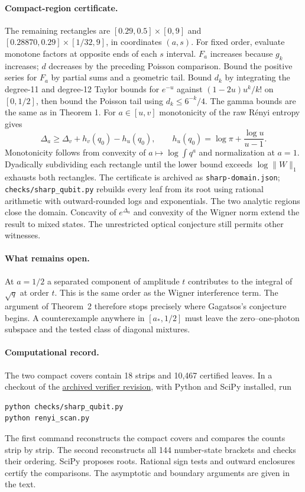 \documentclass[11pt]{article}
\newcommand{\D}{\Delta}
\begin{document}
\paragraph{Compact-region certificate.}
The remaining rectangles are $[0.29,0.5]\times[0,9]$ and $[0.28870,0.29]\times[1/32,9]$, in coordinates $(a,s)$. For fixed order, evaluate monotone factors at opposite ends of each $s$ interval. $F_a$ increases because $g_k$ increases; $d$ decreases by the preceding Poisson comparison. Bound the positive series for $F_a$ by partial sums and a geometric tail. Bound $d_k$ by integrating the degree-11 and degree-12 Taylor bounds for $e^{-u}$ against $(1-2u)u^k/k!$ on $[0,1/2]$, then bound the Poisson tail using $d_k\le6^{-k}/4$. The gamma bounds are the same as in Theorem 1. For $a\in[u,v]$ monotonicity of the raw R\'enyi entropy gives
\[
 \D_a\ge\D_v+h_v(q_0)-h_u(q_0),\qquad h_u(q_0)=\log\pi+\frac{\log u}{u-1}.
\]
Monotonicity follows from convexity of $a\mapsto\log\int q^a$ and normalization at $a=1$. Dyadically subdividing each rectangle until the lower bound exceeds $\log\|W\|_1$ exhausts both rectangles. The certificate is archived as \texttt{sharp-domain.json}; \texttt{checks/sharp\_qubit.py} rebuilds every leaf from its root using rational arithmetic with outward-rounded logs and exponentials. The two analytic regions close the domain. Concavity of $e^{\D_a}$ and convexity of the Wigner norm extend the result to mixed states. The unrestricted optical conjecture still permits other witnesses.

\paragraph{What remains open.}
At $a=1/2$ a separated component of amplitude $t$ contributes to the integral of $\sqrt q$ at order $t$. This is the same order as the Wigner interference term. The argument of Theorem~2 therefore stops precisely where Gagatsos's conjecture begins. A counterexample anywhere in $[a_*,1/2]$ must leave the zero--one-photon subspace and the tested class of diagonal mixtures.

\paragraph{Computational record.}
The two compact covers contain 18 strips and 10,467 certified leaves. In a checkout of the \href{https://github.com/shunyaekam/oo-research/tree/f043c097d8de06399ba3b95c753af113e436df9a}{archived verifier revision}, with Python and SciPy installed, run
\begin{verbatim}
python checks/sharp_qubit.py
python renyi_scan.py
\end{verbatim}
The first command reconstructs the compact covers and compares the counts strip by strip. The second reconstructs all 144 number-state brackets and checks their ordering. SciPy proposes roots. Rational sign tests and outward enclosures certify the comparisons. The asymptotic and boundary arguments are given in the text.
\end{document}
